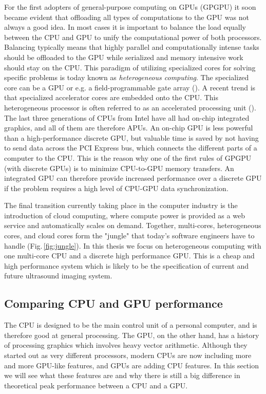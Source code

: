 For the first adopters of general-purpose computing on GPUs (GPGPU) it soon became evident that offloading all types of computations to the GPU was not always a good idea. In most cases it is important to balance the load equally between the CPU and GPU to unify the computational power of both processors. Balancing typically means that highly parallel and computationally intense tasks should be offloaded to the GPU while serialized and memory intensive work should stay on the CPU. This paradigm of utilizing specialized cores for solving specific problems is today known as \textit{heterogeneous computing}. The specialized core can be a GPU or e.g. a field-programmable gate array (). A recent trend is that specialized accelerator cores are embedded onto the CPU. This heterogeneous processor is often referred to as an accelerated processing unit (). The last three generations of CPUs from Intel have all had on-chip integrated graphics, and all of them are therefore APUs. An on-chip GPU is less powerful than a high-performance discrete GPU, but valuable time is saved by not having to send data across the PCI Express bus, which connects the different parts of a computer to the CPU. This is the reason why one of the first rules of GPGPU (with discrete GPUs) is to minimize CPU-to-GPU memory transfers. An integrated GPU can therefore provide increased performance over a discrete GPU if the problem requires a high level of CPU-GPU data synchronization.

The final transition currently taking place in the computer industry is the introduction of cloud computing, where compute power is provided as a web service and automatically scales on demand. Together, multi-cores, heterogeneous cores, and cloud cores form the "jungle" that today's software engineers have to handle (Fig.\,\ref{fig:jungle}). In this thesis we focus on heterogeneous computing with one multi-core CPU and a discrete high performance GPU. This is a cheap and high performance system which is likely to be the specification of current and future ultrasound imaging system.

\subsection{Comparing CPU and GPU performance}\label{sec:cpu_vs_gpu}
The CPU is designed to be the main control unit of a personal computer, and is therefore good at general processing. The GPU, on the other hand, has a history of processing graphics which involves heavy vector arithmetic. Although they started out as very different processors, modern CPUs are now including more and more GPU-like features, and GPUs are adding CPU features. In this section we will see what these features are and why there is still a big difference in theoretical peak performance between a CPU and a GPU.

